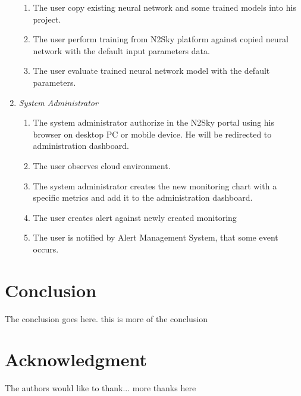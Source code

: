 \documentclass[10pt, conference, compsocconf]{IEEEtran}
\begin{document}
\begin{enumerate}
\begin{enumerate}
\item The user copy existing neural network and some trained models into his project. 
\item The user perform training from N2Sky platform against copied neural network with the default input parameters data.
\item The user evaluate trained neural network model with the default parameters. 
\end{enumerate}
\item \emph{System Administrator}
\begin{enumerate}
\item The system administrator authorize in the N2Sky portal using his browser on desktop PC or mobile device. He will be redirected to administration dashboard.
\item The user observes cloud environment.
\item The system administrator creates the new monitoring chart with a specific metrics and add it to the administration dashboard.
\item The user creates alert against newly created monitoring
\item The user is notified by Alert Management System, that some event occurs.
\end{enumerate}
\end{enumerate}




\section{Conclusion}
The conclusion goes here. this is more of the conclusion



\section*{Acknowledgment}


The authors would like to thank...
more thanks here




%
%
%





\end{document}
